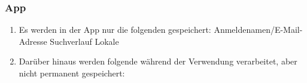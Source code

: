 \subsubsection{App}

\begin{enumerate}
    \item Es werden in der App nur die folgenden %
        gespeichert:
        \subitem Anmeldenamen/E-Mail-Adresse
        \subitem Suchverlauf
        \subitem Lokale %
        
        
    \item Darüber hinaus werden folgende %
        während der Verwendung verarbeitet, aber nicht permanent gespeichert:
        \subitem %

\end{enumerate}